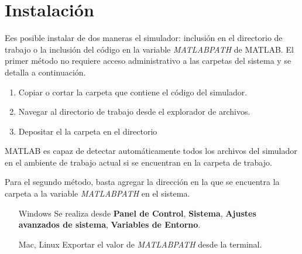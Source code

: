 \section{Instalación}

Ees posible instalar de dos maneras el simulador: inclusión en el 
directorio de trabajo o la inclusión del código en 
la variable \emph{MATLABPATH} de MATLAB. El primer método no requiere acceso
administrativo a las carpetas del sistema y se detalla a continuación.

\begin{enumerate}
 \item Copiar o cortar la carpeta que contiene el código del simulador.
 \item Navegar al directorio de trabajo desde el explorador de archivos.
 \item Depositar el la carpeta en el directorio
\end{enumerate}

MATLAB es capaz de detectar automáticamente todos los archivos del simulador en 
el ambiente de trabajo actual si se encuentran en la carpeta de trabajo.

Para el segundo método, basta agregar la dirección en la que se encuentra la 
carpeta a la variable \emph{MATLABPATH} en el sistema. 

\begin{itemize}
 \item [Windows] Se realiza desde \textbf{Panel de Control}, \textbf{Sistema},
 \textbf{Ajustes avanzados de sistema}, \textbf{Variables de Entorno}.
 \item [Mac, Linux] Exportar el valor de \emph{MATLABPATH} desde la terminal.
\end{itemize}


 

